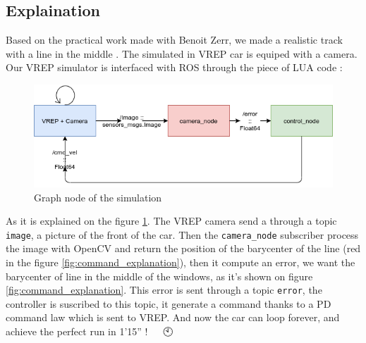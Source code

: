 \subsection{Explaination}

Based on the practical work made with Benoit Zerr, we made a realistic track with a line in the middle \cite{zerr}.
The simulated in VREP car is equiped with a camera. Our VREP simulator is interfaced with ROS through the piece of LUA code :

\begin{figure}[ht!]
    \begin{center}
        \includegraphics[scale=0.5]{Images/graph_node_simulation.png}
    \end{center}
    \caption{Graph node of the simulation}
    \label{fig:graph_node_simulation}

\end{figure}

As it is explained on the figure \ref{fig:graph_node_simulation}. The VREP camera send a through a topic \texttt{image}, a picture of the front of the car. 
Then the \texttt{camera\_node} subscriber process the image with OpenCV and return the position
of the barycenter of the line (red in the figure \ref{fig:command_explanation}), then it compute an error, we want the barycenter of line in the middle of the windows, as it's shown on figure \ref{fig:command_explanation}. 
This error is sent through a topic \texttt{error}, the controller is suscribed to this topic,
it generate a command thanks to a PD command law which is sent to VREP. And now the car can loop forever, and achieve 
the perfect run in 1'15'' ! 🚙 🏁 🕙

